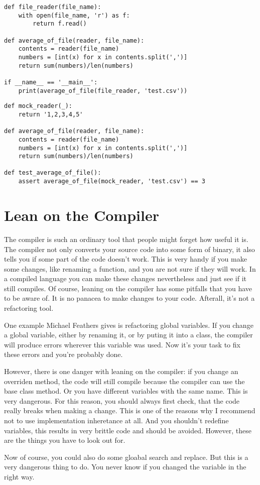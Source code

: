 \begin{programcode}{}
\begin{verbatim}
def file_reader(file_name):
    with open(file_name, 'r') as f:
        return f.read()

def average_of_file(reader, file_name):
    contents = reader(file_name)
    numbers = [int(x) for x in contents.split(',')]
    return sum(numbers)/len(numbers)

if __name__ == '__main__':
    print(average_of_file(file_reader, 'test.csv'))
\end{verbatim}
\end{programcode}


\begin{programcode}{}
\begin{verbatim}
def mock_reader(_):
    return '1,2,3,4,5'

def average_of_file(reader, file_name):
    contents = reader(file_name)
    numbers = [int(x) for x in contents.split(',')]
    return sum(numbers)/len(numbers)

def test_average_of_file():
    assert average_of_file(mock_reader, 'test.csv') == 3
\end{verbatim}
\end{programcode}

\section{Lean on the Compiler}

The compiler is such an ordinary tool that people might forget how useful it is. The compiler not only converts your source code into some form of binary, it also tells you if some part of the code doesn't work. This is very handy if you make some changes, like renaming a function, and you are not sure if they will work. In a compiled language you can make these changes nevertheless and just see if it still compiles. Of course, leaning on the compiler has some pitfalls that you have to be aware of. It is no panacea to make changes to your code. Afterall, it's not a refactoring tool.

One example Michael Feathers gives is refactoring global variables. If you change a global variable, either by renaming it, or by puting it into a class, the compiler will produce errors wherever this variable was used. Now it's your task to fix these errors and you're probably done.

However, there is one danger with leaning on the compiler: if you change an overriden method, the code will still compile because the compiler can use the base class method. Or you have different variables with the same name. This is very dangerous. For this reason, you should always first check, that the code really breaks when making a change. This is one of the reasons why I recommend not to use implementation inheretance at all. And you shouldn't redefine variables, this results in very brittle code and should be avoided. However, these are the things you have to look out for. 

Now of course, you could also do some gloabal search and replace. But this is a very dangerous thing to do. You never know if you changed the variable in the right way.

